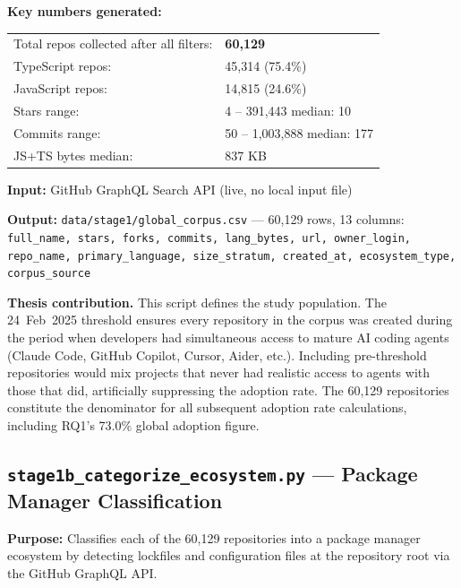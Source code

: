 \documentclass[11pt,a4paper]{article}
\begin{document}
\begin{numbersbox}
\textbf{Key numbers generated:}\\[2pt]
\begin{tabular}{@{}ll@{}}
Total repos collected after all filters: & \textbf{60,129} \\
TypeScript repos:                        & 45,314 (75.4\%) \\
JavaScript repos:                        & 14,815 (24.6\%) \\
Stars range:                             & 4 -- 391,443 \quad median: 10 \\
Commits range:                           & 50 -- 1,003,888 \quad median: 177 \\
JS+TS bytes median:                      & 837 KB \\
\end{tabular}
\end{numbersbox}

\textbf{Input:} GitHub GraphQL Search API (live, no local input file)

\textbf{Output:} \texttt{data/stage1/global\_corpus.csv} --- 60,129 rows,
13 columns: \texttt{full\_name, stars, forks, commits, lang\_bytes, url,
owner\_login, repo\_name, primary\_language, size\_stratum, created\_at,
ecosystem\_type, corpus\_source}

\begin{outputbox}
\textbf{Thesis contribution.}
This script defines the study population. The 24~Feb~2025 threshold ensures
every repository in the corpus was created during the period when developers
had simultaneous access to mature AI coding agents (Claude Code, GitHub
Copilot, Cursor, Aider, etc.). Including pre-threshold repositories would
mix projects that never had realistic access to agents with those that did,
artificially suppressing the adoption rate. The 60,129 repositories
constitute the denominator for all subsequent adoption rate calculations,
including RQ1's 73.0\% global adoption figure.
\end{outputbox}

\newpage

\subsection*{\texttt{stage1b\_categorize\_ecosystem.py} --- Package Manager Classification}

\begin{infobox}
\textbf{Purpose:} Classifies each of the 60,129 repositories into a package
manager ecosystem by detecting lockfiles and configuration files at the
repository root via the GitHub GraphQL API.
\end{infobox}
\end{document}
